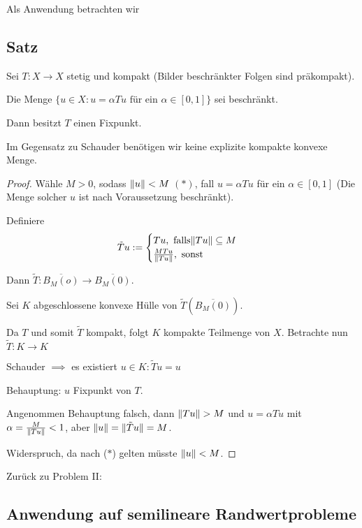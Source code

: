 Als Anwendung betrachten wir

\subsection{Satz}

Sei $T \colon X \to X$ stetig und kompakt (Bilder beschränkter Folgen sind präkompakt).

Die Menge $\{u \in X \colon u = \alpha Tu \text{ für  ein } \alpha \in [0,1]\}$ sei beschränkt.

Dann besitzt $T$ einen Fixpunkt.

\begin{bem}
  Im Gegensatz zu Schauder benötigen wir keine explizite kompakte konvexe Menge.
\end{bem}

\begin{proof}
  Wähle $M > 0$, sodass $\lVert u \rVert < M$ $(\ast)$, fall $u = \alpha Tu$ für ein $\alpha \in [0,1]$ (Die Menge solcher $u$ ist nach Voraussetzung beschränkt).

  Definiere
  $$
  \tilde T u := 
  \begin{cases}
    T u, \text{ falls} \lVert T u \rVert \subseteq M \\
    \frac{M Tu}{\lVert T u \rVert}, \text{ sonst}
  \end{cases}
  $$

  Dann $\tilde T \colon \overline{B_M(o)} \to \overline{B_M(0)}$.

  Sei $K$ abgeschlossene konvexe Hülle von $\tilde T(\overline{B_M(0)})$.

  Da $T$ und somit $\tilde T$ kompakt, folgt $K$ kompakte Teilmenge von $X$.  Betrachte nun $\tilde T \colon K \to K$

  Schauder $\implies$ es existiert $u \in K \colon \tilde T u = u$

  Behauptung: $u$ Fixpunkt von $T$.

  Angenommen Behauptung falsch, dann $\lVert Tu \rVert > M$ und $u = \alpha Tu$ mit $\alpha = \frac{M}{\lVert Tu \rVert} < 1$, aber $\lVert u \rVert = \lVert \tilde Tu \rVert = M$. 

  Widerspruch, da nach ($\ast$) gelten müsste $\lVert u \rVert < M$.
\end{proof}

Zurück zu Problem II:

\subsection{Anwendung auf semilineare Randwertprobleme}

